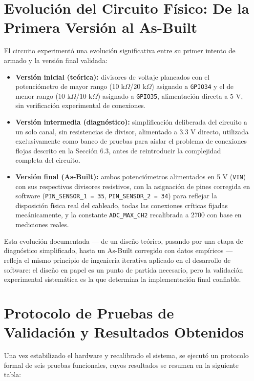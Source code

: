 \documentclass[12pt, letterpaper]{article}
\begin{document}
	\section{Evolución del Circuito Físico: De la Primera Versión al As-Built}
	El circuito experimentó una evolución significativa entre su primer intento de armado y la versión final validada:
	\begin{itemize}
		\item \textbf{Versión inicial (teórica):} divisores de voltaje planeados con el potenciómetro de mayor rango (10 k$\Omega$/20 k$\Omega$) asignado a \texttt{GPIO34} y el de menor rango (10 k$\Omega$/10 k$\Omega$) asignado a \texttt{GPIO35}, alimentación directa a 5 V, sin verificación experimental de conexiones.
		\item \textbf{Versión intermedia (diagnóstico):} simplificación deliberada del circuito a un solo canal, sin resistencias de divisor, alimentado a 3.3 V directo, utilizada exclusivamente como banco de pruebas para aislar el problema de conexiones flojas descrito en la Sección 6.3, antes de reintroducir la complejidad completa del circuito.
		\item \textbf{Versión final (As-Built):} ambos potenciómetros alimentados en 5 V (\texttt{VIN}) con sus respectivos divisores resistivos, con la asignación de pines corregida en software (\texttt{PIN\_SENSOR\_1 = 35}, \texttt{PIN\_SENSOR\_2 = 34}) para reflejar la disposición física real del cableado, todas las conexiones críticas fijadas mecánicamente, y la constante \texttt{ADC\_MAX\_CH2} recalibrada a 2700 con base en mediciones reales.
	\end{itemize}
	Esta evolución documentada — de un diseño teórico, pasando por una etapa de diagnóstico simplificado, hasta un As-Built corregido con datos empíricos — refleja el mismo principio de ingeniería iterativa aplicado en el desarrollo de software: el diseño en papel es un punto de partida necesario, pero la validación experimental sistemática es la que determina la implementación final confiable.
	
	\section{Protocolo de Pruebas de Validación y Resultados Obtenidos}
	Una vez estabilizado el hardware y recalibrado el sistema, se ejecutó un protocolo formal de seis pruebas funcionales, cuyos resultados se resumen en la siguiente tabla:
	
\end{document}
